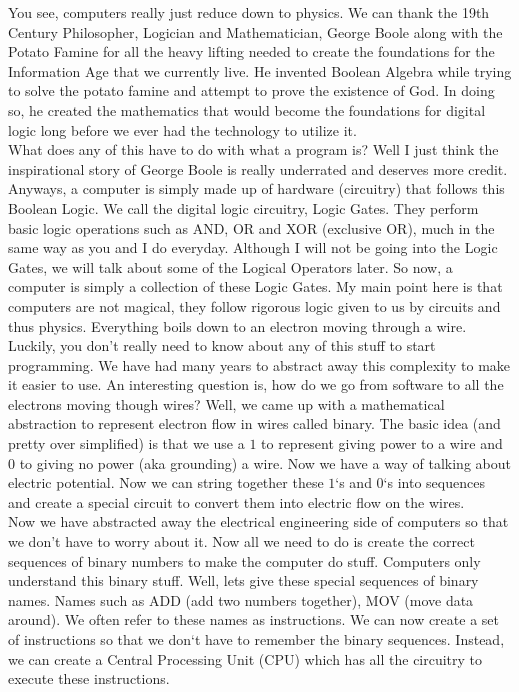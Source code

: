 \documentclass[11]{article}
\begin{document}
You see, computers really just reduce down to physics. We can thank the 19th Century Philosopher, Logician and Mathematician, George Boole along with the Potato Famine for all the heavy lifting needed to create the foundations for the Information Age that we currently live. He invented Boolean Algebra while trying to solve the potato famine and attempt to prove the existence of God. In doing so, he created the mathematics that would become the foundations for digital logic long before we ever had the technology to utilize it.\\

What does any of this have to do with what a program is? Well I just think the inspirational story of George Boole is really underrated and deserves more credit. Anyways, a computer is simply made up of hardware (circuitry) that follows this Boolean Logic. We call the digital logic circuitry, Logic Gates. They perform basic logic operations such as AND, OR and XOR (exclusive OR), much in the same way as you and I do everyday. Although I will not be going into the Logic Gates, we will talk about some of the Logical Operators later. So now, a computer is simply a collection of these Logic Gates. My main point here is that computers are not magical, they follow rigorous logic given to us by circuits and thus physics. Everything boils down to an electron moving through a wire.\\

Luckily, you don't really need to know about any of this stuff to start programming. We have had many years to abstract away this complexity to make it easier to use. An interesting question is, how do we go from software to all the electrons moving though wires? Well, we came up with a mathematical abstraction to represent electron flow in wires called binary. The basic idea (and pretty over simplified) is that we use a $1$ to represent giving power to a wire and $0$ to giving no power (aka grounding) a wire. Now we have a way of talking about electric potential. Now we can string together these $1$`s and $0$`s into sequences and create a special circuit to convert them into electric flow on the wires.\\

Now we have abstracted away the electrical engineering side of computers so that we don't have to worry about it. Now all we need to do is create the correct sequences of binary numbers to make the computer do stuff. Computers only understand this binary stuff. Well, lets give these special sequences of binary names. Names such as ADD (add two numbers together), MOV (move data around). We often refer to these names as instructions. We can now create a set of instructions so that we don`t have to remember the binary sequences. Instead, we can create a Central Processing Unit (CPU) which has all the circuitry to execute these instructions.\\
\end{document}
